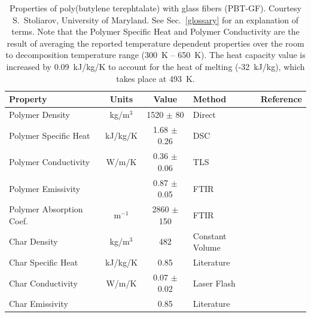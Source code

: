 \begin{table}[h!]
\caption[Properties of poly(butylene terephtalate) with glass fibers (PBT-GF)]{Properties of poly(butylene terephtalate) with glass fibers (PBT-GF).
Courtesy S.~Stoliarov, University of Maryland. See Sec.~\ref{glossary} for an explanation of terms. Note that the Polymer Specific Heat and Polymer Conductivity
are the result of averaging the reported temperature dependent properties over the room to decomposition temperature range (300~K -- 650~K).
The heat capacity value is increased by 0.09~kJ/kg/K to account for the heat of melting (-32~kJ/kg), which takes place at 493~K.}
\begin{center}
\begin{tabular}{|l|c|c|l|l|}
\hline
Property                &      Units    &      Value                        & Method                                    & Reference                     \\ \hline \hline
Polymer Density         &     kg/m$^3$  & 1520 $\pm$ 80                     & Direct                                    & \cite{Kempel:1}               \\ \hline
Polymer Specific Heat   &    kJ/kg/K    & 1.68 $\pm$ 0.26                   & DSC                                       & \cite{Kempel:1}               \\ \hline
Polymer Conductivity    &      W/m/K    & 0.36 $\pm$ 0.06                   & TLS                                       & \cite{Kempel:1}               \\ \hline
Polymer Emissivity      &               & 0.87 $\pm$ 0.05                   & FTIR                                      & \cite{Linteris:2}             \\ \hline
Polymer Absorption Coef.&  m$^{-1}$     & 2860 $\pm$ 150                    & FTIR                                      & \cite{Linteris:2}             \\ \hline
Char Density            &     kg/m$^3$  &        482                        & Constant Volume                           & \cite{Kempel:1}               \\ \hline
Char Specific Heat      &    kJ/kg/K    &        0.85                       & Literature                                & \cite{SCHOTT}                 \\ \hline
Char Conductivity       &      W/m/K    & 0.07 $\pm$ 0.02                   & Laser Flash                               & \cite{Kempel:1}               \\ \hline
Char Emissivity         &               &       0.85                        & Literature                                & \cite{Braeuer:1}              \\ \hline

\end{tabular}
\end{center}
\end{table}

